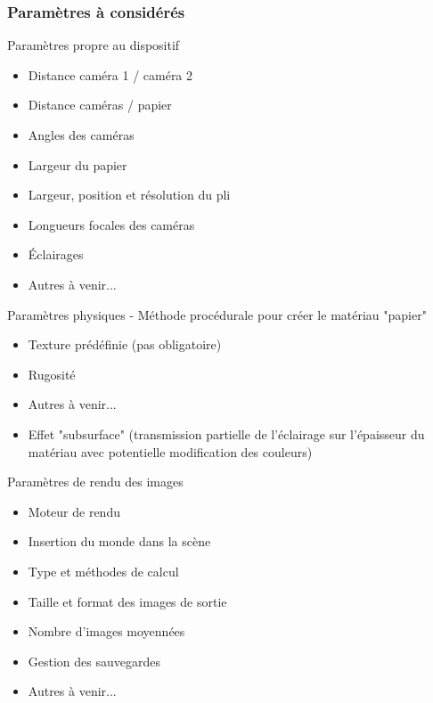 \documentclass[8pt]{beamer}
\begin{document}
	\begin{frame}
		\frametitle{Paramètres à considérés}
		\begin{block}{Paramètres propre au dispositif}
			\begin{multicols}{3}
				\begin{itemize}
					\item Distance caméra 1 / caméra 2
					\item Distance caméras / papier
					\item Angles des caméras
					\item Largeur du papier
					\item Largeur, position et résolution du pli
					\item Longueurs focales des caméras
					\item \'Eclairages
					\item Autres à venir...
				\end{itemize}
			\end{multicols}
		\end{block}
		\begin{block}{Paramètres physiques - Méthode procédurale pour créer le matériau "papier"}
			\begin{multicols}{2}
				\begin{itemize}
					\item Texture prédéfinie (pas obligatoire)
					\item Rugosité
					\item Autres à venir...
					\item Effet "subsurface" (transmission partielle de l'éclairage sur l'épaisseur du matériau avec potentielle modification des couleurs)
				\end{itemize}
			\end{multicols}
		\end{block}
		\begin{block}{Paramètres de rendu des images}
			\begin{multicols}{3}
				\begin{itemize}
					\item Moteur de rendu
					\item Insertion du monde dans la scène
					\item Type et méthodes de calcul
					\item Taille et format des images de sortie
					\item Nombre d'images moyennées
					\item Gestion des sauvegardes
					\item Autres à venir...
				\end{itemize}
			\end{multicols}
		\end{block}
	\end{frame}
\end{document}
